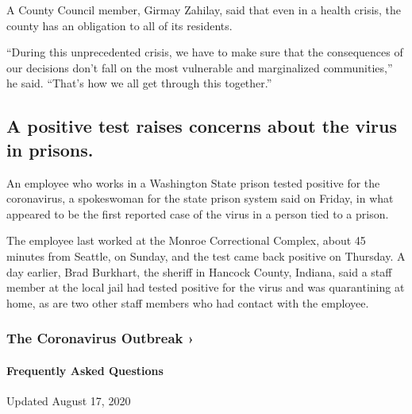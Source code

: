 A County Council member, Girmay Zahilay, said that even in a health
crisis, the county has an obligation to all of its residents.

``During this unprecedented crisis, we have to make sure that the
consequences of our decisions don't fall on the most vulnerable and
marginalized communities,'' he said. ``That's how we all get through
this together.''

\hypertarget{a-positive-test-raises-concerns-about-the-virus-in-prisons}{%
\subsection{A positive test raises concerns about the virus in
prisons.}\label{a-positive-test-raises-concerns-about-the-virus-in-prisons}}

An employee who works in a Washington State prison tested positive for
the coronavirus, a spokeswoman for the state prison system said on
Friday, in what appeared to be the first reported case of the virus in a
person tied to a prison.

The employee last worked at the Monroe Correctional Complex, about 45
minutes from Seattle, on Sunday, and the test came back positive on
Thursday. A day earlier, Brad Burkhart, the sheriff in Hancock County,
Indiana, said a staff member at the local jail had tested positive for
the virus and was quarantining at home, as are two other staff members
who had contact with the employee.

\href{https://www.nytimes3xbfgragh.onion/news-event/coronavirus?action=click\&pgtype=Article\&state=default\&region=MAIN_CONTENT_3\&context=storylines_faq}{}

\hypertarget{the-coronavirus-outbreak-}{%
\subsubsection{The Coronavirus Outbreak
›}\label{the-coronavirus-outbreak-}}

\hypertarget{frequently-asked-questions}{%
\paragraph{Frequently Asked
Questions}\label{frequently-asked-questions}}

Updated August 17, 2020

